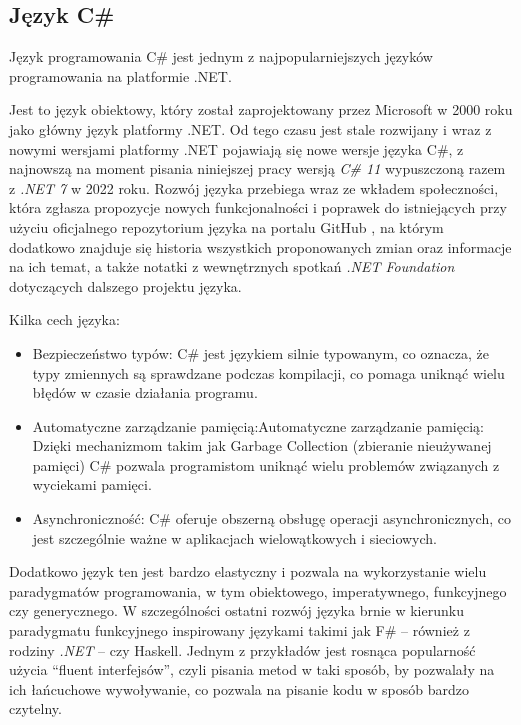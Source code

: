 \subsection{Język C\#}

Język programowania C\# jest jednym z najpopularniejszych języków programowania na platformie .NET.

Jest to język obiektowy, który został zaprojektowany przez Microsoft w 2000 roku jako główny język platformy .NET.
Od tego czasu jest stale rozwijany i wraz z nowymi wersjami platformy .NET pojawiają się nowe wersje języka C\#, z najnowszą na moment pisania niniejszej pracy wersją \emph{C\# 11} wypuszczoną razem z \emph{.NET 7} w 2022 roku.
Rozwój języka przebiega wraz ze wkładem społeczności, która zgłasza propozycje nowych funkcjonalności i poprawek do istniejących przy użyciu oficjalnego repozytorium języka na portalu GitHub \cite{dotnet-csharplang-repo}, na którym dodatkowo znajduje się historia wszystkich proponowanych zmian oraz informacje na ich temat, a także notatki z wewnętrznych spotkań \emph{.NET Foundation} dotyczących dalszego projektu języka.

Kilka cech języka:

\begin{itemize}

  \item Bezpieczeństwo typów: C\# jest językiem silnie typowanym, co oznacza, że typy zmiennych są sprawdzane podczas kompilacji, co pomaga uniknąć wielu błędów w czasie działania programu.

  \item Automatyczne zarządzanie pamięcią:Automatyczne zarządzanie pamięcią: Dzięki mechanizmom takim jak Garbage Collection (zbieranie nieużywanej pamięci) C\# pozwala programistom uniknąć wielu problemów związanych z wyciekami pamięci.

  \item Asynchroniczność: C\# oferuje obszerną obsługę operacji asynchronicznych, co jest szczególnie ważne w aplikacjach wielowątkowych i sieciowych.

\end{itemize}

Dodatkowo język ten jest bardzo elastyczny i pozwala na wykorzystanie wielu paradygmatów programowania, w tym obiektowego, imperatywnego, funkcyjnego czy generycznego.
W szczególności ostatni rozwój języka brnie w kierunku paradygmatu funkcyjnego inspirowany językami takimi jak F\# -- również z rodziny \emph{.NET} -- czy Haskell.
Jednym z przykładów jest rosnąca popularność użycia ``fluent interfejsów'', czyli pisania metod w taki sposób, by pozwalały na ich łańcuchowe wywoływanie, co pozwala na pisanie kodu w sposób bardzo czytelny.

